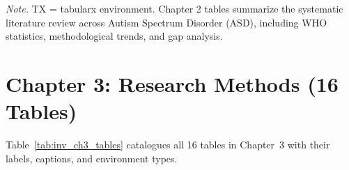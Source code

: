 \vspace{0.5em}\noindent\textit{Note.} TX = tabularx environment. Chapter 2 tables summarize the systematic literature review across Autism Spectrum Disorder (ASD), including WHO statistics, methodological trends, and gap analysis.

\section{Chapter 3: Research Methods (16 Tables)}
\label{sec:inv_ch3}

\noindent Table~\ref{tab:inv_ch3_tables} catalogues all 16 tables in Chapter~3 with their labels, captions, and environment types.


